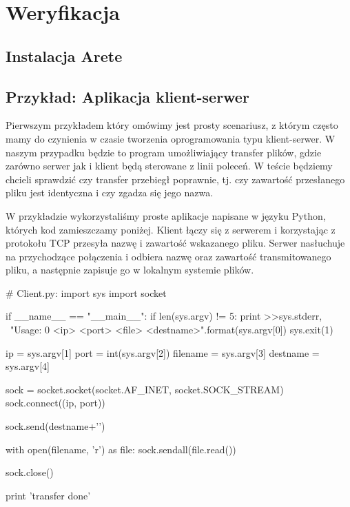 \documentclass[00-praca-magisterska.tex]{subfiles}
\begin{document}
\chapter{Weryfikacja}


\section{Instalacja Arete}


\section{Przykład: Aplikacja klient-serwer}

Pierwszym przykładem który omówimy jest prosty scenariusz, z którym często mamy
do czynienia w czasie tworzenia oprogramowania typu klient-serwer. W naszym
przypadku będzie to program umożliwiający transfer plików, gdzie zarówno serwer
jak i klient będą sterowane z linii poleceń. W teście będziemy chcieli sprawdzić
czy transfer przebiegł poprawnie, tj. czy zawartość przesłanego pliku jest
identyczna i czy zgadza się jego nazwa.

W przykładzie wykorzystaliśmy proste aplikacje napisane w języku Python, których
kod zamieszczamy poniżej. Klient łączy się z serwerem i korzystając z protokołu
TCP przesyła nazwę i zawartość wskazanego pliku. Serwer nasłuchuje na
przychodzące połączenia i odbiera nazwę oraz zawartość transmitowanego pliku, a
następnie zapisuje go w lokalnym systemie plików.

\begin{pythoncode}
  # Client.py:
  import sys
  import socket

  if __name__ == "__main__":
      if len(sys.argv) != 5:
	  print >>sys.stderr, \
	      "Usage: {0} <ip> <port> <file> <destname>".format(sys.argv[0])
	  sys.exit(1)

      ip = sys.argv[1]
      port = int(sys.argv[2])
      filename = sys.argv[3]
      destname = sys.argv[4]

      sock = socket.socket(socket.AF_INET, socket.SOCK_STREAM)
      sock.connect((ip, port))

      sock.send(destname+'\n')

      with open(filename, 'r') as file:
          sock.sendall(file.read())

      sock.close()

      print 'transfer done'

\end{pythoncode}
\end{document}
